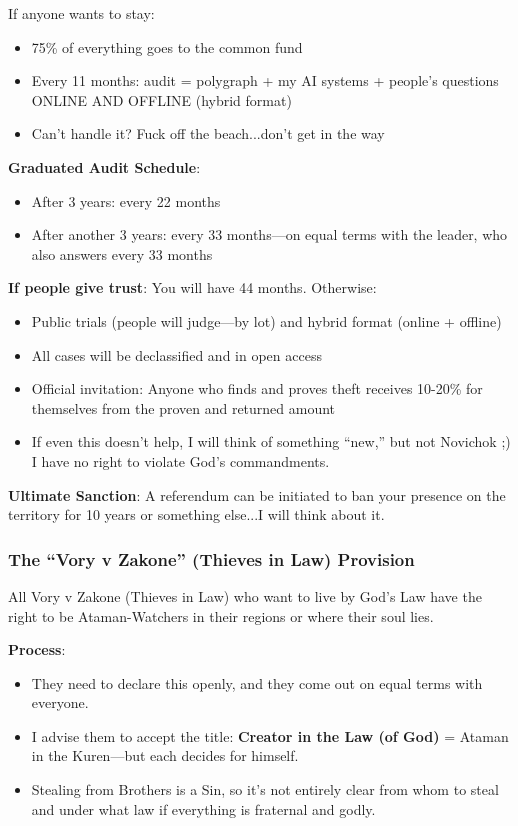 \documentclass[11pt,a4paper]{article}
\theoremstyle{definition}
\theoremstyle{remark}
\begin{document}
If anyone wants to stay:
\begin{itemize}
\item 75\% of everything goes to the common fund
\item Every 11 months: audit = polygraph + my AI systems + people's questions ONLINE AND OFFLINE (hybrid format)
\item Can't handle it? Fuck off the beach...don't get in the way
\end{itemize}

\textbf{Graduated Audit Schedule}:
\begin{itemize}
\item After 3 years: every 22 months
\item After another 3 years: every 33 months—on equal terms with the leader, who also answers every 33 months
\end{itemize}

\textbf{If people give trust}: You will have 44 months. Otherwise:
\begin{itemize}
\item Public trials (people will judge—by lot) and hybrid format (online + offline)
\item All cases will be declassified and in open access
\item Official invitation: Anyone who finds and proves theft receives 10-20\% for themselves from the proven and returned amount
\item If even this doesn't help, I will think of something ``new,'' but not Novichok ;) I have no right to violate God's commandments.
\end{itemize}

\textbf{Ultimate Sanction}: A referendum can be initiated to ban your presence on the territory for 10 years or something else...I will think about it.

\subsubsection{The ``Vory v Zakone'' (Thieves in Law) Provision}

All Vory v Zakone (Thieves in Law) who want to live by God's Law have the right to be Ataman-Watchers in their regions or where their soul lies.

\textbf{Process}:
\begin{itemize}
\item They need to declare this openly, and they come out on equal terms with everyone.
\item I advise them to accept the title: \textbf{Creator in the Law (of God)} = Ataman in the Kuren—but each decides for himself.
\item Stealing from Brothers is a Sin, so it's not entirely clear from whom to steal and under what law if everything is fraternal and godly.
\end{itemize}
\end{document}

